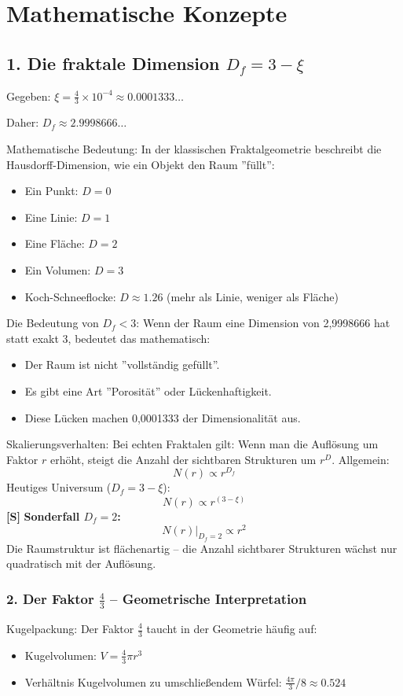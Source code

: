 	\section{Mathematische Konzepte}
	
	\subsection{1. Die fraktale Dimension \( D_f = 3 - \xi \)}
	Gegeben: \( \xi = \frac{4}{3} \times 10^{-4} \approx 0.0001333\ldots \)
	
	Daher: \( D_f \approx 2.9998666\ldots \)
	
	Mathematische Bedeutung:
	In der klassischen Fraktalgeometrie beschreibt die Hausdorff-Dimension, wie ein Objekt den Raum ''füllt'':
	\begin{itemize}
		\item Ein Punkt: \( D = 0 \)
		\item Eine Linie: \( D = 1 \)
		\item Eine Fläche: \( D = 2 \)
		\item Ein Volumen: \( D = 3 \)
		\item Koch-Schneeflocke: \( D \approx 1.26 \) (mehr als Linie, weniger als Fläche)
	\end{itemize}
	
	Die Bedeutung von \( D_f < 3 \):
	Wenn der Raum eine Dimension von 2,9998666 hat statt exakt 3, bedeutet das mathematisch:
	\begin{itemize}
		\item Der Raum ist nicht ''vollständig gefüllt''.
		\item Es gibt eine Art ''Porosität'' oder Lückenhaftigkeit.
		\item Diese Lücken machen 0,0001333 der Dimensionalität aus.
	\end{itemize}
	
	Skalierungsverhalten:
	Bei echten Fraktalen gilt: Wenn man die Auflösung um Faktor \( r \) erhöht, steigt die Anzahl der sichtbaren Strukturen um \( r^D \). Allgemein:
	\[
	N(r) \propto r^{D_f}
	\]
	Heutiges Universum (\( D_f = 3 - \xi \)):
	\[
	N(r) \propto r^{(3-\xi)}
	\]
	\textbf{[S]} \textbf{Sonderfall \(D_f = 2\):}
	\[
	N(r)\big|_{D_f=2} \propto r^{2}
	\]
	Die Raumstruktur ist flächenartig – die Anzahl sichtbarer Strukturen wächst nur quadratisch mit der Auflösung.
	
	\subsubsection{2. Der Faktor \( \frac{4}{3} \) – Geometrische Interpretation}
	Kugelpackung:
	Der Faktor \( \frac{4}{3} \) taucht in der Geometrie häufig auf:
	\begin{itemize}
		\item Kugelvolumen: \( V = \frac{4}{3}\pi r^3 \)
		\item Verhältnis Kugelvolumen zu umschließendem Würfel: \( \frac{4\pi}{3}/8 \approx 0.524 \)
	\end{itemize}
	
